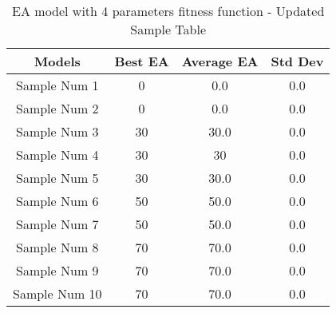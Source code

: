 \documentclass{article}
\begin{document}
\begin{table}[h]
\centering
\caption{EA model with 4 parameters fitness function - Updated Sample Table}
\label{tab:sample}
\begin{tabular}{|c|c|c|c|}
\hline
\textbf{Models} & \textbf{Best EA} & \textbf{Average EA} & \textbf{Std Dev} \\
\hline
Sample Num 1 & 0 & 0.0 & 0.0 \\
\hline
Sample Num 2 & 0 & 0.0 & 0.0 \\
\hline
Sample Num 3 & 30 & 30.0 & 0.0 \\
\hline
Sample Num 4 & 30 & 30 & 0.0 \\
\hline
Sample Num 5 & 30 & 30.0 & 0.0 \\
\hline
Sample Num 6 & 50 & 50.0 & 0.0 \\
\hline
Sample Num 7 & 50 & 50.0 & 0.0 \\
\hline
Sample Num 8 & 70 & 70.0 & 0.0 \\
\hline
Sample Num 9 & 70 & 70.0 & 0.0 \\
\hline
Sample Num 10 & 70 & 70.0 & 0.0 \\
\hline
\end{tabular}
\end{table}
\end{document}
